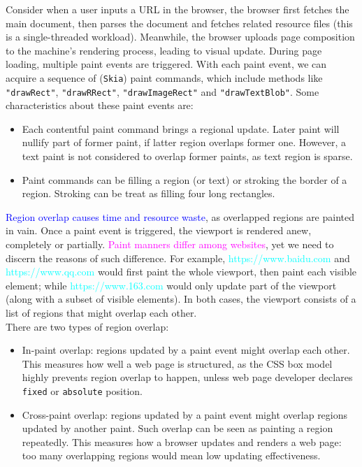 \documentclass{article}
\begin{document}
Consider when a user inputs a URL in the browser, the browser first fetches the main document, then parses the document and fetches related resource files (this is a single-threaded workload). Meanwhile, the browser uploads page composition to the machine's rendering process, leading to visual update. During page loading, multiple paint events are triggered. With each paint event, we can acquire a sequence of (\texttt{Skia}) paint commands, which include methods like \texttt{"drawRect"}, \texttt{"drawRRect"}, \texttt{"drawImageRect"} and \texttt{"drawTextBlob"}. Some characteristics about these paint events are:

\begin{itemize}
	\item Each contentful paint command brings a regional update. Later paint will nullify part of  former paint, if latter region overlaps former one. However, a text paint is not considered to overlap former paints, as text region is sparse.

	\item Paint commands can be filling a region (or text) or stroking the border of a region. Stroking can be treat as filling four long rectangles.
\end{itemize}

\textcolor{blue}{Region overlap causes time and resource waste}, as overlapped regions are painted in vain. Once a paint event is triggered, the viewport is rendered anew, completely or partially. \textcolor{magenta}{Paint manners differ among websites}, yet we need to discern the reasons of such difference. For example, \textcolor{cyan}{https://www.baidu.com} and \textcolor{cyan}{https://www.qq.com} would first paint the whole viewport, then paint each visible element; while \textcolor{cyan}{https://www.163.com} would only update part of the viewport (along with a subset of visible elements). In both cases, the viewport consists of a list of regions that might overlap each other. \\

There are two types of region overlap:
\begin{itemize}
	\item In-paint overlap: regions updated by a paint event might overlap each other. This measures how well a web page is structured, as the CSS box model highly prevents region overlap to happen, unless web page developer declares \texttt{fixed} or \texttt{absolute} position.

	\item Cross-paint overlap: regions updated by a paint event might overlap regions updated by another paint. Such overlap can be seen as painting a region repeatedly. This measures how a browser updates and renders a web page: too many overlapping regions would mean low updating effectiveness. 
\end{itemize}
\end{document}
